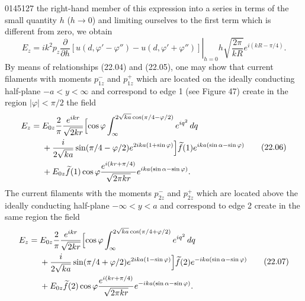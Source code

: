 \begin{scanpage}{0145}{127}
the right-hand member of this expression into a series in terms of the small quantity $h$ ($h\to0$) and limiting ourselves to the first term which is different from zero, we obtain
\[
E_z=ik^2p_z\left.\frac{\partial}{\partial h}[u(d,\varphi'-\varphi'')-u(d,\varphi'+\varphi'')]\right|_{h=0}h\sqrt{\frac{2\pi}{kR}}e^{i(kR-\pi/4)}.\tag{22.05}
\]
By means of relationships (22.04) and (22.05), one may show that current filaments with moments $p_{1z}^-$ and $p_{1z}^+$ which are located on the ideally conducting half-plane $-a<y<\infty$ and correspond to edge 1 (see Figure 47) create in the region $|\varphi|<\pi/2$ the field
\[
\begin{aligned}E_z={}&E_{0z}\frac2\pi\frac{e^{ikr}}{\sqrt{2kr}}\Bigl[\cos\varphi\int_\infty^{2\sqrt{ka}\cos(\pi/4-\varphi/2)}e^{iq^2}\,dq\\
&+\frac{i}{2\sqrt{ka}}\sin(\pi/4-\varphi/2)e^{2ika(1+\sin\varphi)}\Bigr]\widetilde f(1)e^{ika(\sin\alpha-\sin\varphi)}\\
&+E_{0z}\widetilde f(1)\cos\varphi\frac{e^{i(kr+\pi/4)}}{\sqrt{2\pi kr}}e^{ika(\sin\alpha-\sin\varphi)}.
\end{aligned}\tag{22.06}
\]
The current filaments with the moments $p_{2z}^-$ and $p_{2z}^+$ which are located above the ideally conducting half-plane $-\infty<y<a$ and correspond to edge 2 create in the same region the field
\[
\begin{aligned}E_z={}&E_{0z}\frac2\pi\frac{e^{ikr}}{\sqrt{2kr}}\Bigl[\cos\varphi\int_\infty^{2\sqrt{ka}\cos(\pi/4+\varphi/2)}e^{iq^2}\,dq\\
&+\frac{i}{2\sqrt{ka}}\sin(\pi/4+\varphi/2)e^{2ika(1-\sin\varphi)}\Bigr]\widetilde f(2)e^{-ika(\sin\alpha-\sin\varphi)}\\
&+E_{0z}\widetilde f(2)\cos\varphi\frac{e^{i(kr+\pi/4)}}{\sqrt{2\pi kr}}e^{-ika(\sin\alpha-\sin\varphi)}.
\end{aligned}\tag{22.07}
\]
\end{scanpage}
